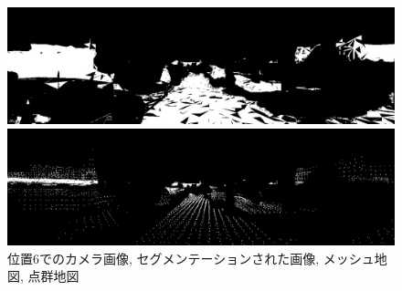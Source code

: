 \begin{figure}[htbp]
\begin{minipage}[b]{0.50\hsize}
\begin{center}
  \end{center}
 \end{minipage} \\
  \begin{minipage}[b]{0.50\hsize}
 \begin{center}
  \includegraphics[keepaspectratio, scale=0.18]{./picture/valued_mesh_map_image/image5.jpg}
  \end{center}
 \end{minipage}
 \begin{minipage}[b]{0.50\hsize}
 \begin{center}
  \includegraphics[keepaspectratio, scale=0.18]{./picture/valued_point_map_image/image5.jpg}
  \end{center}
 \end{minipage}
 \caption{位置6でのカメラ画像, セグメンテーションされた画像, メッシュ地図, 点群地図}\label{fig:place6}
\end{figure}

